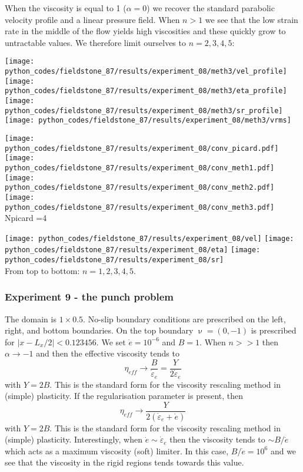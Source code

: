 When the viscosity is equal to 1 ($\alpha=0$) we recover the standard parabolic 
velocity profile and a linear pressure field.
When $n>1$ we see that the low strain rate in the middle of the flow
yields high viscosities and these quickly grow to untractable values. 
We therefore limit ourselves to $n=2,3,4,5$:

\begin{center}
\texttt{[image: python\_codes/fieldstone\_87/results/experiment\_08/meth3/vel\_profile]}
\texttt{[image: python\_codes/fieldstone\_87/results/experiment\_08/meth3/eta\_profile]}\\
\texttt{[image: python\_codes/fieldstone\_87/results/experiment\_08/meth3/sr\_profile]}
\texttt{[image: python\_codes/fieldstone\_87/results/experiment\_08/meth3/vrms]}
\end{center}

\begin{center}
\texttt{[image: python\_codes/fieldstone\_87/results/experiment\_08/conv\_picard.pdf]}
\texttt{[image: python\_codes/fieldstone\_87/results/experiment\_08/conv\_meth1.pdf]}\\
\texttt{[image: python\_codes/fieldstone\_87/results/experiment\_08/conv\_meth2.pdf]}
\texttt{[image: python\_codes/fieldstone\_87/results/experiment\_08/conv\_meth3.pdf]}\\
{\captionfont Npicard =4}
\end{center}

\begin{center}
\texttt{[image: python\_codes/fieldstone\_87/results/experiment\_08/vel]}
\texttt{[image: python\_codes/fieldstone\_87/results/experiment\_08/eta]}
\texttt{[image: python\_codes/fieldstone\_87/results/experiment\_08/sr]}\\
{\captionfont From top to bottom: $n=1,2,3,4,5$.}
\end{center}

\newpage
\subsubsection*{Experiment 9 - the punch problem}

The domain is $1\times0.5$. No-slip boundary conditions are prescribed on the left, right, and bottom 
boundaries. On the top boundary $\upnu=(0,-1)$ is prescribed for $|x-L_x/2|<0.123456$.
We set $\dot{e}=10^{-6}$ and $B=1$.
When $n >> 1$ then $\alpha \rightarrow -1$ and then the effective viscosity tends to 
\[
\eta_{eff} \rightarrow 
\frac{B}{\dot\varepsilon_e}
=
\frac{Y}{2\dot\varepsilon_e}
\] 
with $Y=2B$. This is the standard form for the viscosity rescaling method in (simple) plasticity.
If the regularisation parameter is present, then 
\[
\eta_{eff} \rightarrow 
\frac{Y}{2(\dot\varepsilon_e + \dot{e})}
\] 
with $Y=2B$. This is the standard form for the viscosity rescaling method in (simple) plasticity.
Interestingly, when $\dot{e} \sim \dot\varepsilon_e$ then the 
viscosity tends to $\sim B/\dot{e}$ which acts as a maximum viscosity (soft) limiter.
In this case, $B/\dot{e}=10^6$ and we see that the viscosity in the rigid regions tends towards this value.

